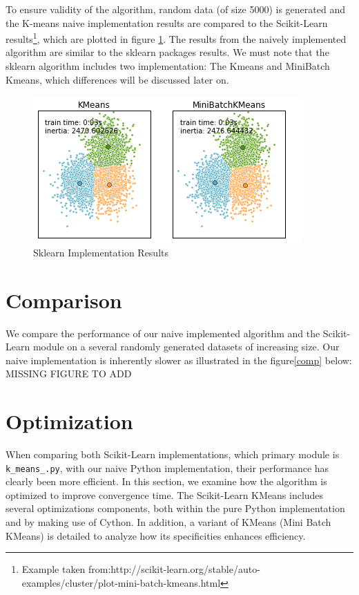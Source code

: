 \documentclass[11pt]{article}
\begin{document}
\noindent To ensure validity of the algorithm, random data (of size 5000) is generated and the K-means naive implementation results are compared to the Scikit-Learn results\footnote{Example taken from:http://scikit-learn.org/stable/auto-examples/cluster/plot-mini-batch-kmeans.html}, which are plotted in figure \ref{results}. The results from the naively implemented algorithm are similar to the sklearn packages results. We must note that the sklearn algorithm includes two implementation: The Kmeans and MiniBatch Kmeans, which differences will be discussed later on.

	\begin{figure}[ht!] 
		\centering
		\includegraphics[scale=0.8]{Figures/kmeans.png}
		\caption{Sklearn Implementation Results}
		\label{results}
	\end{figure}

\section*{Comparison}

We compare the performance of our naive implemented algorithm and the Scikit-Learn module on a several randomly generated datasets of increasing size. Our naive implementation is inherently slower as illustrated in the figure\ref{comp} below: \\

MISSING FIGURE TO ADD

\section*{Optimization}
When comparing both Scikit-Learn implementations, which primary module is \verb|k_means_.py|, with our naive Python implementation, their performance has clearly been more efficient.
In this section, we examine how the algorithm is optimized to improve convergence time. The Scikit-Learn KMeans includes several optimizations components, both within the pure Python implementation and by making use of Cython. In addition, a variant of KMeans (Mini Batch KMeans) is detailed to analyze how its specificities enhances efficiency.  
\end{document}
